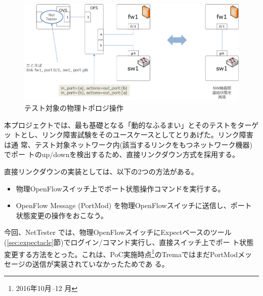 \begin{figure}[h]
 \centering
 \includegraphics[scale=0.6]{img/patch-layer1.png}
 \caption{テスト対象の物理トポロジ操作}
 \label{fig:patch-layer1}
\end{figure}

本プロジェクトでは、最も基礎となる「動的なふるまい」とそのテストをターゲッ
トとし、リンク障害試験をそのユースケースとしてとりあげた。リンク障害は通
常、テスト対象ネットワーク内(該当するリンクをもつネットワーク機器)でポー
トのup/downを検出するため、直接リンクダウン方式を採用する。

直接リンクダウンの実装としては、以下の2つの方法がある。
\begin{itemize}
 \item 物理OpenFlowスイッチ上でポート状態操作コマンドを実行する。
 \item OpenFlow Message (PortMod) を物理OpenFlowスイッチに送信し、ポート
       状態変更の操作をおこなう。
\end{itemize}
今回、NetTester では、物理OpenFlowスイッチにExpectベースのツール
(\ref{sec:expectacle}節)でログイン/コマンド実行し、直接スイッチ上でポー
ト状態変更する方法をとった。これは、PoC実施時点\footnote{2016年10月--12
月}のTremaではまだPortModメッセージの送信が実装されていなかったためであ
る。




